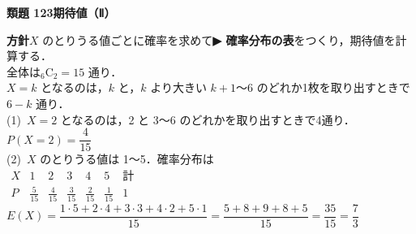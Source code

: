 \documentclass[a4paper,11pt]{ltjsarticle}
\newcommand{\ans}[2]{\Needspace{5\baselineskip}\vspace{6pt}%
  {\sffamily\bfseries 類題 #1\quad #2}\par}
\newcommand{\point}[1]{\textsf{\bfseries ▶ #1}}
\begin{document}
\ans{123}{期待値（Ⅱ）}
\begin{kai}
\textbf{方針}\quad $X$ のとりうる値ごとに確率を求めて\point{確率分布の表}をつくり，期待値を計算する．\\[2pt]
全体は\quad ${}_6\mathrm C_2=15$ 通り．\\
$X=k$ となるのは，$k$ と，$k$ より大きい $k+1$〜6 のどれか1枚を取り出すときで $6-k$ 通り．\\[2pt]
(1)\ $X=2$ となるのは，2 と 3〜6 のどれかを取り出すときで4通り．\quad $P(X=2)=\dfrac{4}{15}$\\[2pt]
(2)\ $X$ のとりうる値は 1〜5．確率分布は\\[2pt]
\hspace*{1.5em}$\begin{array}{c|ccccc|c}X&1&2&3&4&5&\text{計}\\ \hline P&\frac5{15}&\frac4{15}&\frac3{15}&\frac2{15}&\frac1{15}&1\end{array}$\\[4pt]
\hspace*{1.5em}$E(X)=\dfrac{1\cdot5+2\cdot4+3\cdot3+4\cdot2+5\cdot1}{15}=\dfrac{5+8+9+8+5}{15}=\dfrac{35}{15}=\dfrac73$
\end{kai}
\end{document}
